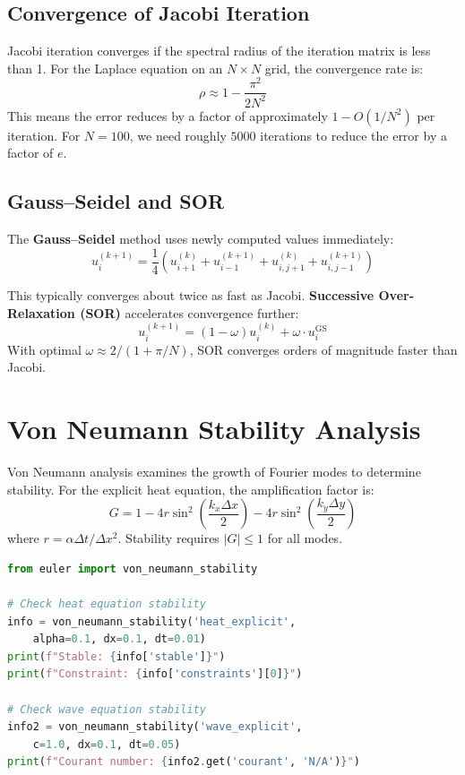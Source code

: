 \subsection{Convergence of Jacobi Iteration}

Jacobi iteration converges if the spectral radius of the iteration matrix is less than 1.
For the Laplace equation on an $N \times N$ grid, the convergence rate is:
\[
\rho \approx 1 - \frac{\pi^2}{2N^2}
\]
This means the error reduces by a factor of approximately $1 - O(1/N^2)$ per iteration.
For $N = 100$, we need roughly $5000$ iterations to reduce the error by a factor of $e$.

\subsection{Gauss--Seidel and SOR}

The \textbf{Gauss--Seidel} method uses newly computed values immediately:
\[
u_i^{(k+1)} = \frac{1}{4} \left( u_{i+1}^{(k)} + u_{i-1}^{(k+1)} + u_{i,j+1}^{(k)} + u_{i,j-1}^{(k+1)} \right)
\]

This typically converges about twice as fast as Jacobi. \textbf{Successive Over-Relaxation (SOR)}
accelerates convergence further:
\[
u_i^{(k+1)} = (1-\omega)u_i^{(k)} + \omega \cdot u_i^{\text{GS}}
\]
With optimal $\omega \approx 2/(1 + \pi/N)$, SOR converges orders of magnitude faster than Jacobi.

\section{Von Neumann Stability Analysis}

Von Neumann analysis examines the growth of Fourier modes to determine stability.
For the explicit heat equation, the amplification factor is:
\[
G = 1 - 4r \sin^2\left(\frac{k_x \Delta x}{2}\right) - 4r \sin^2\left(\frac{k_y \Delta y}{2}\right)
\]
where $r = \alpha \Delta t / \Delta x^2$. Stability requires $|G| \leq 1$ for all modes.

\begin{lstlisting}[language=Python, caption=Stability analysis]
from euler import von_neumann_stability

# Check heat equation stability
info = von_neumann_stability('heat_explicit',
    alpha=0.1, dx=0.1, dt=0.01)
print(f"Stable: {info['stable']}")
print(f"Constraint: {info['constraints'][0]}")

# Check wave equation stability
info2 = von_neumann_stability('wave_explicit',
    c=1.0, dx=0.1, dt=0.05)
print(f"Courant number: {info2.get('courant', 'N/A')}")
\end{lstlisting}

